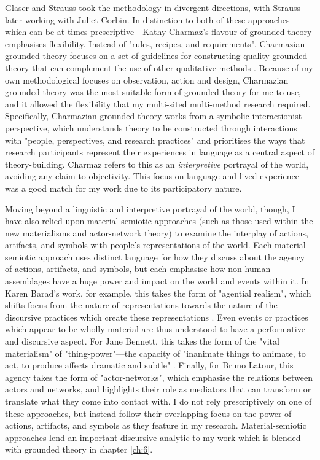 Glaser and Strauss took the methodology in divergent directions, with Strauss later working with Juliet Corbin. In distinction to both of these approaches—which can be at times prescriptive—Kathy Charmaz's flavour of grounded theory emphasises flexibility. Instead of "rules, recipes, and requirements", Charmazian grounded theory focuses on a set of guidelines for constructing quality grounded theory that can complement the use of other qualitative methods  \cite[p. 10]{charmaz_constructing_2006}. Because of my own methodological focuses on observation, action and design, Charmazian grounded theory was the most suitable form of grounded theory for me to use, and it allowed the flexibility that my multi-sited multi-method research required. Specifically, Charmazian grounded theory works from a symbolic interactionist perspective, which understands theory to be constructed through interactions with "people, perspectives, and research practices" \citeyearpar[p. 10]{charmaz_constructing_2006} and prioritises the ways that research participants represent their experiences in language as a central aspect of theory-building. Charmaz refers to this as an \textit{interpretive} portrayal of the world, avoiding any claim to objectivity. This focus on language and lived experience was a good match for my work due to its participatory nature. 

Moving beyond a linguistic and interpretive portrayal of the world, though, I have also relied upon material-semiotic approaches (such as those used within the new materialisms and actor-network theory) to examine the interplay of actions, artifacts, and symbols with people's representations of the world. Each material-semiotic approach uses distinct language for how they discuss about the agency of actions, artifacts, and symbols, but each emphasise how non-human assemblages have a huge power and impact on the world and events within it. In Karen Barad's work, for example, this takes the form of "agential realism", which shifts focus from the nature of representations towards the nature of the discursive practices which create these representations \citep[p. 45]{barad_meeting_2007}. Even events or practices which appear to be wholly material are thus understood to have a performative and discursive aspect. For Jane Bennett, this takes the form of the "vital materialism" of "thing-power"—the capacity of "inanimate things to animate, to act, to produce affects dramatic and subtle" \citep[p. 6]{bennett_vibrant_2010}. Finally,  for Bruno Latour, this agency takes the form of "actor-networks", which emphasise the relations between actors and networks, and highlights their role as mediators that can transform or translate what they come into contact with. I do not rely prescriptively on one of these approaches, but instead follow their overlapping focus on the power of actions, artifacts, and symbols as they feature in my research. Material-semiotic approaches lend an important discursive analytic to my work which is blended with grounded theory in chapter \ref{ch:6}. 

